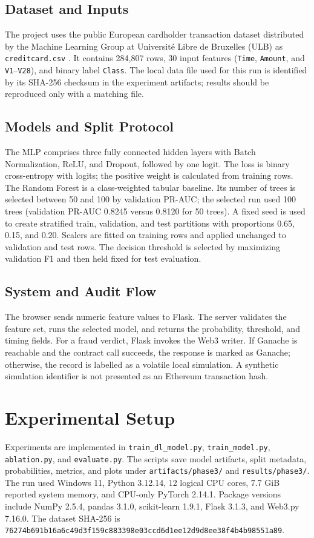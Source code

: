 \documentclass[conference]{IEEEtran}
\begin{document}
\subsection{Dataset and Inputs}
The project uses the public European cardholder transaction dataset distributed by the Machine Learning Group at Universit\'e Libre de Bruxelles (ULB) as \texttt{creditcard.csv} \cite{ulbdataset}. It contains 284,807 rows, 30 input features (\texttt{Time}, \texttt{Amount}, and \texttt{V1}--\texttt{V28}), and binary label \texttt{Class}. The local data file used for this run is identified by its SHA-256 checksum in the experiment artifacts; results should be reproduced only with a matching file.

\subsection{Models and Split Protocol}
The MLP comprises three fully connected hidden layers with Batch Normalization, ReLU, and Dropout, followed by one logit. The loss is binary cross-entropy with logits; the positive weight is calculated from training rows. The Random Forest is a class-weighted tabular baseline. Its number of trees is selected between 50 and 100 by validation PR-AUC; the selected run used 100 trees (validation PR-AUC 0.8245 versus 0.8120 for 50 trees). A fixed seed is used to create stratified train, validation, and test partitions with proportions 0.65, 0.15, and 0.20. Scalers are fitted on training rows and applied unchanged to validation and test rows. The decision threshold is selected by maximizing validation F1 and then held fixed for test evaluation.

\subsection{System and Audit Flow}
The browser sends numeric feature values to Flask. The server validates the feature set, runs the selected model, and returns the probability, threshold, and timing fields. For a fraud verdict, Flask invokes the Web3 writer. If Ganache is reachable and the contract call succeeds, the response is marked as Ganache; otherwise, the record is labelled as a volatile local simulation. A synthetic simulation identifier is not presented as an Ethereum transaction hash.

\section{Experimental Setup}
Experiments are implemented in \texttt{train\_dl\_model.py}, \texttt{train\_model.py}, \texttt{ablation.py}, and \texttt{evaluate.py}. The scripts save model artifacts, split metadata, probabilities, metrics, and plots under \texttt{artifacts/phase3/} and \texttt{results/phase3/}. The run used Windows 11, Python 3.12.14, 12 logical CPU cores, 7.7 GiB reported system memory, and CPU-only PyTorch 2.14.1. Package versions include NumPy 2.5.4, pandas 3.1.0, scikit-learn 1.9.1, Flask 3.1.3, and Web3.py 7.16.0. The dataset SHA-256 is \texttt{76274b691b16a6c49d3f159c883398e03ccd6d1ee12d9d8ee38f4b4b98551a89}.
\end{document}

